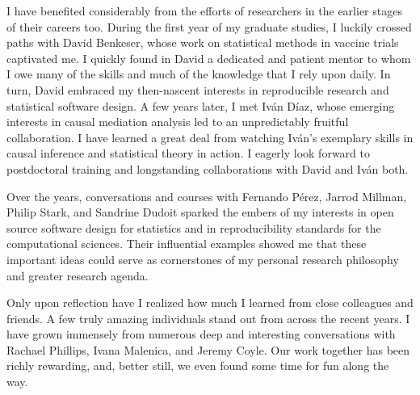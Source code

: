 \documentclass{ucbthesis}
\begin{document}
\begin{frontmatter}
\begin{acknowledgements}
I have benefited considerably from the efforts of researchers in the earlier
stages of their careers too. During the first year of my graduate studies,
I luckily crossed paths with David Benkeser, whose work on statistical methods
in vaccine trials captivated me. I quickly found in David a dedicated and
patient mentor to whom I owe many of the skills and much of the knowledge that
I rely upon daily. In turn, David embraced my then-nascent interests in
reproducible research and statistical software design.
A few years later, I met Iv\'{a}n D\'{i}az, whose emerging interests in causal
mediation analysis led to an unpredictably fruitful collaboration. I have
learned a great deal from watching Iv\'{a}n's exemplary skills in causal
inference and statistical theory in action.
I eagerly look forward to postdoctoral training and longstanding collaborations
with David and Iv\'{a}n both.

Over the years, conversations and courses with Fernando P{\'e}rez, Jarrod
Millman, Philip Stark, and Sandrine Dudoit sparked the embers of my interests in
open source software design for statistics and in reproducibility standards for
the computational sciences. Their influential examples showed me that these
important ideas could serve as cornerstones of my personal research philosophy
and greater research agenda.

Only upon reflection have I realized how much I learned from close colleagues
and friends. A few truly amazing individuals stand out from across the recent
years. I have grown immensely from numerous deep and interesting conversations
with Rachael Phillips, Ivana Malenica, and Jeremy Coyle. Our work together has
been richly rewarding, and, better still, we even found some time for fun along
the way.

\end{acknowledgements}

\end{frontmatter}

\pagestyle{headings}










\printbibliography
\end{document}
